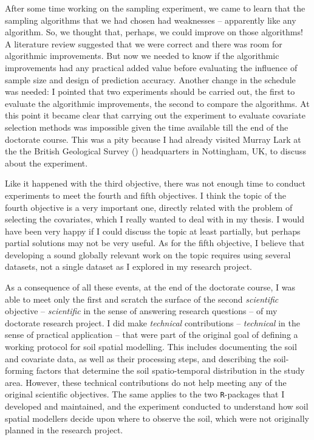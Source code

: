 After some time working on the sampling experiment, we came to learn that the sampling algorithms that we had 
chosen had weaknesses -- apparently like any algorithm. So, we thought that, perhaps, we could improve on 
those algorithms! A literature review suggested that we were correct and there was room for algorithmic 
improvements. But now we needed to know if the algorithmic improvements had any practical added value before 
evaluating the influence of sample size and design of prediction accuracy. Another change in the schedule was 
needed: I pointed
that two experiments should be carried out, the first to evaluate the algorithmic improvements, the second to 
compare the algorithms. At this point it became clear that carrying out the experiment to evaluate covariate 
selection methods was impossible given the time available till the end of the doctorate course. This was a 
pity 
because I had already visited Murray Lark at the the British Geological Survey (\bgs) headquarters in 
Nottingham, UK, to discuss about the experiment.

Like it happened with the third objective, there was not enough time to conduct experiments to meet the fourth 
and fifth objectives. I think the topic of the fourth objective is a very important one, directly related 
with the problem of selecting the covariates, which I really wanted to deal with in my thesis. I would have 
been very happy if I could discuss the topic at least partially, but perhaps partial solutions may not be very 
useful. As for the fifth objective, I believe that developing a sound globally relevant work on the topic 
requires using several datasets, not a single dataset as I explored in my research project.

As a consequence of all these events, at the end of the doctorate course, I was able to meet only the first and 
scratch the surface of the second \emph{scientific} objective -- \emph{scientific} in the sense of answering 
research questions -- of my doctorate research project. I did make \emph{technical} contributions -- 
\emph{technical} in the sense of practical application -- that were part of the original goal of defining a 
working protocol for soil spatial modelling. This includes documenting the soil and covariate data, as well as 
their processing steps, and describing the soil-forming factors that determine the soil spatio-temporal 
distribution 
in the study area. However, these technical contributions do not help meeting any of the original scientific 
objectives. The same applies to the two \texttt{R}-packages that I developed and maintained, and the 
experiment 
conducted to understand how soil spatial modellers decide upon where to observe the soil, which were not 
originally planned in the research project.

